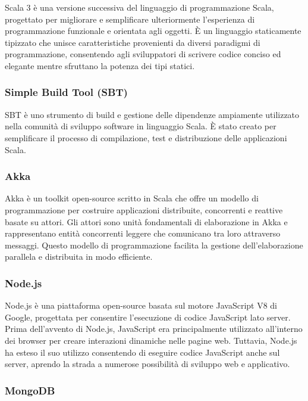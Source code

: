 \documentclass{scrartcl}
\begin{document}
Scala 3 è una versione successiva del linguaggio di programmazione Scala, progettato per migliorare e semplificare ulteriormente l'esperienza di programmazione funzionale e orientata agli oggetti. È un linguaggio staticamente tipizzato che unisce caratteristiche provenienti da diversi paradigmi di programmazione, consentendo agli sviluppatori di scrivere codice conciso ed elegante mentre sfruttano la potenza dei tipi statici.

\subsubsection{Simple Build Tool (SBT)}

SBT è uno strumento di build e gestione delle dipendenze ampiamente utilizzato nella comunità di sviluppo software in linguaggio Scala. È stato creato per semplificare il processo di compilazione, test e distribuzione delle applicazioni Scala.

\subsubsection{Akka}

Akka è un toolkit open-source scritto in Scala che offre un modello di programmazione per costruire applicazioni distribuite, concorrenti e reattive basate su attori. Gli attori sono unità fondamentali di elaborazione in Akka e rappresentano entità concorrenti leggere che comunicano tra loro attraverso messaggi. Questo modello di programmazione facilita la gestione dell'elaborazione parallela e distribuita in modo efficiente.

\subsubsection{Node.js}

Node.js\cite{nodejs} è una piattaforma open-source basata sul motore JavaScript V8 di Google, progettata per consentire l'esecuzione di codice JavaScript lato server. Prima dell'avvento di Node.js, JavaScript era principalmente utilizzato all'interno dei browser per creare interazioni dinamiche nelle pagine web. Tuttavia, Node.js ha esteso il suo utilizzo consentendo di eseguire codice JavaScript anche sul server, aprendo la strada a numerose possibilità di sviluppo web e applicativo.

\subsubsection{MongoDB}
\end{document}
